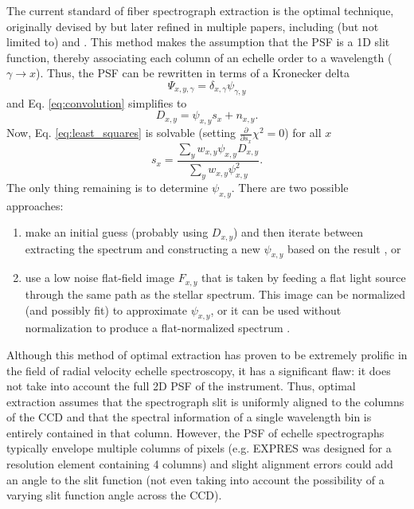 \documentclass[11pt]{article}
\begin{document}
The current standard of fiber spectrograph extraction is the optimal technique, originally devised by \citet{Horne1986} but later refined in multiple papers, including (but not limited to) \citet{Piskunov2002} and \citet{Zechmeister2013}. This method makes the assumption that the PSF is a 1D slit function, thereby associating each column of an echelle order to a wavelength ($\gamma \rightarrow x$). Thus, the PSF can be rewritten in terms of a Kronecker delta
\begin{equation}
    \Psi_{x,y,\gamma} = \delta_{x,\gamma}\psi_{\gamma,y}
\label{eq:psf_optimal}
\end{equation}
and Eq. \ref{eq:convolution} simplifies to
\begin{equation}
    D_{x,y} = \psi_{x,y} s_x + n_{x,y}.
\end{equation}
Now, Eq. \ref{eq:least_squares} is solvable (setting $\frac{\partial}{\partial s_x} \chi^2 = 0$) for all $x$
\begin{equation}
    s_x = \frac{\sum_y w_{x,y} \psi_{x,y} D_{x,y}}{\sum_y w_{x,y} \psi^2_{x,y}}.
\end{equation}
The only thing remaining is to determine $\psi_{x,y}$. There are two possible approaches:
\begin{enumerate}
    \item make an initial guess (probably using $D_{x,y}$) and then iterate between extracting the spectrum and constructing a new $\psi_{x,y}$ based on the result \citep{Horne1986, Piskunov2002}, or
    \item use a low noise flat-field image $F_{x,y}$ that is taken by feeding a flat light source through the same path as the stellar spectrum. This image can be normalized (and possibly fit) to approximate $\psi_{x,y}$, or it can be used without normalization to produce a flat-normalized spectrum \citep{Zechmeister2013}.
\end{enumerate}

Although this method of optimal extraction has proven to be extremely prolific in the field of radial velocity echelle spectroscopy, it has a significant flaw: it does not take into account the full 2D PSF of the instrument. Thus, optimal extraction assumes that the spectrograph slit is uniformly aligned to the columns of the CCD and that the spectral information of a single wavelength bin is entirely contained in that column. However, the PSF of echelle spectrographs typically envelope multiple columns of pixels (e.g. EXPRES was designed for a resolution element containing 4 columns) and slight alignment errors could add an angle to the slit function (not even taking into account the possibility of a varying slit function angle across the CCD).
\end{document}
